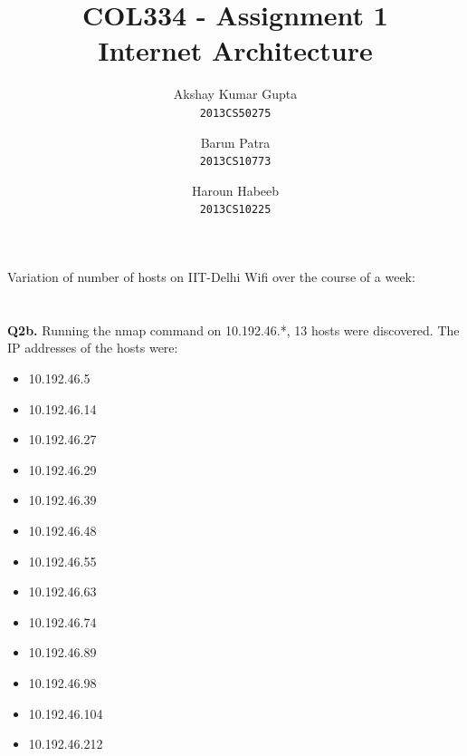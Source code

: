 \documentclass[12pt]{article}
\begin{document}
\title{COL334 - Assignment 1\\ Internet Architecture}
\author{Akshay Kumar Gupta\\\texttt{2013CS50275} \and  Barun Patra\\\texttt{2013CS10773} \and Haroun Habeeb\\\texttt{2013CS10225}}
\date{}
\maketitle
{} Variation of number of hosts on IIT-Delhi Wifi over the course of a week:\\
~
\\

{}
~
\\
{\bfseries Q2b.} Running the nmap command on 10.192.46.*, 13 hosts were discovered. The IP addresses of the hosts were:
\begin{itemize}
\item 10.192.46.5
\item 10.192.46.14
\item 10.192.46.27
\item 10.192.46.29
\item 10.192.46.39
\item 10.192.46.48
\item 10.192.46.55
\item 10.192.46.63
\item 10.192.46.74
\item 10.192.46.89
\item 10.192.46.98
\item 10.192.46.104
\item 10.192.46.212
\end{itemize}
\end{document}
